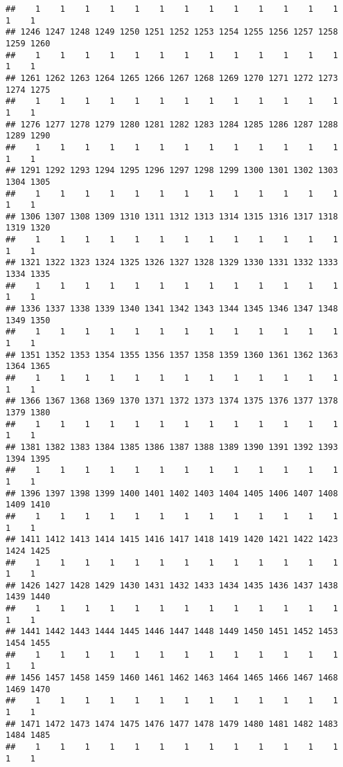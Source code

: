 \documentclass[]{article}
\begin{document}
\begin{verbatim}
##    1    1    1    1    1    1    1    1    1    1    1    1    1    1    1 
## 1246 1247 1248 1249 1250 1251 1252 1253 1254 1255 1256 1257 1258 1259 1260 
##    1    1    1    1    1    1    1    1    1    1    1    1    1    1    1 
## 1261 1262 1263 1264 1265 1266 1267 1268 1269 1270 1271 1272 1273 1274 1275 
##    1    1    1    1    1    1    1    1    1    1    1    1    1    1    1 
## 1276 1277 1278 1279 1280 1281 1282 1283 1284 1285 1286 1287 1288 1289 1290 
##    1    1    1    1    1    1    1    1    1    1    1    1    1    1    1 
## 1291 1292 1293 1294 1295 1296 1297 1298 1299 1300 1301 1302 1303 1304 1305 
##    1    1    1    1    1    1    1    1    1    1    1    1    1    1    1 
## 1306 1307 1308 1309 1310 1311 1312 1313 1314 1315 1316 1317 1318 1319 1320 
##    1    1    1    1    1    1    1    1    1    1    1    1    1    1    1 
## 1321 1322 1323 1324 1325 1326 1327 1328 1329 1330 1331 1332 1333 1334 1335 
##    1    1    1    1    1    1    1    1    1    1    1    1    1    1    1 
## 1336 1337 1338 1339 1340 1341 1342 1343 1344 1345 1346 1347 1348 1349 1350 
##    1    1    1    1    1    1    1    1    1    1    1    1    1    1    1 
## 1351 1352 1353 1354 1355 1356 1357 1358 1359 1360 1361 1362 1363 1364 1365 
##    1    1    1    1    1    1    1    1    1    1    1    1    1    1    1 
## 1366 1367 1368 1369 1370 1371 1372 1373 1374 1375 1376 1377 1378 1379 1380 
##    1    1    1    1    1    1    1    1    1    1    1    1    1    1    1 
## 1381 1382 1383 1384 1385 1386 1387 1388 1389 1390 1391 1392 1393 1394 1395 
##    1    1    1    1    1    1    1    1    1    1    1    1    1    1    1 
## 1396 1397 1398 1399 1400 1401 1402 1403 1404 1405 1406 1407 1408 1409 1410 
##    1    1    1    1    1    1    1    1    1    1    1    1    1    1    1 
## 1411 1412 1413 1414 1415 1416 1417 1418 1419 1420 1421 1422 1423 1424 1425 
##    1    1    1    1    1    1    1    1    1    1    1    1    1    1    1 
## 1426 1427 1428 1429 1430 1431 1432 1433 1434 1435 1436 1437 1438 1439 1440 
##    1    1    1    1    1    1    1    1    1    1    1    1    1    1    1 
## 1441 1442 1443 1444 1445 1446 1447 1448 1449 1450 1451 1452 1453 1454 1455 
##    1    1    1    1    1    1    1    1    1    1    1    1    1    1    1 
## 1456 1457 1458 1459 1460 1461 1462 1463 1464 1465 1466 1467 1468 1469 1470 
##    1    1    1    1    1    1    1    1    1    1    1    1    1    1    1 
## 1471 1472 1473 1474 1475 1476 1477 1478 1479 1480 1481 1482 1483 1484 1485 
##    1    1    1    1    1    1    1    1    1    1    1    1    1    1    1 

\end{verbatim}
\end{document}
